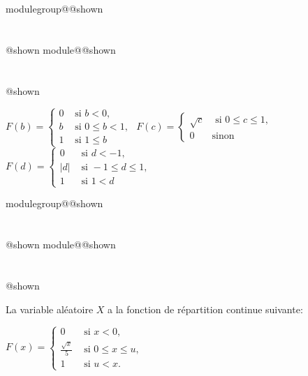 \documentclass{Evaluation}
\makeatletter
\newcommand{\currentmodulekey}{}
\newcommand{\currentmoduletitle}{}
\newcommand{\currentgroupkey}{}
\newcommand{\currentgrouptitle}{}
\newcommand{\showmoduleifneeded}{%
  \ifx\currentgroupkey\empty\else
    \expandafter\ifx\csname modulegroup@\currentgroupkey @shown\endcsname\relax
      \section*{\currentgrouptitle}%
      \expandafter\gdef\csname modulegroup@\currentgroupkey @shown\endcsname{1}%
    \fi
  \fi
  \expandafter\ifx\csname module@\currentmodulekey @shown\endcsname\relax
    \section*{\currentmoduletitle}%
    \expandafter\gdef\csname module@\currentmodulekey @shown\endcsname{1}%
  \fi
}
\newenvironment{H23}{\showmoduleifneeded}{}
\newenvironment{H26}{\showmoduleifneeded}{}
\makeatother
\begin{document}
\begin{questions}
\begin{H26}
\begin{checkboxes}
\correctchoice $ F(b) = \left\{
			\begin{array}{ll}
			0  & \mbox{ si } b<0, \\
			b & \mbox{ si } 0\leq b < 1,\\
			1 & \mbox{ si } 1 \leq b
			\end{array}
			\right. $
\choice $ F(c) = \left\{
			\begin{array}{ll}
			\sqrt{c}  & \mbox{ si } 0\leq c\leq 1, \\
			0 & \mbox{sinon}
			\end{array}
			\right. $
\choice $ F(d) = \left\{
			\begin{array}{ll}
			0  & \mbox{ si } d < -1, \\
			|d| & \mbox{ si } -1 \leq d \leq 1,\\
			1 &  \mbox{ si } 1 < d
			\end{array}
			\right. $
\end{checkboxes}
\end{H26}

\begin{H23}
\question {} %
La variable aléatoire $X$ a la fonction de répartition continue suivante:
\begin{center}
    $F(x)=\left\{
			\displaystyle \begin{array}{ll}
   			0 & \mbox{ si } x < 0,\\
			\displaystyle \frac{\sqrt{x}}{5}  & \mbox{ si } 0\leq x \leq u, \\
                1 & \mbox{ si } u < x.
			\end{array}
			\right.$
\end{center}
\end{H23}
\end{questions}
\end{document}
